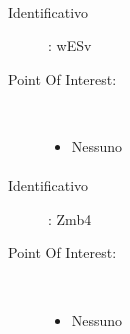 \documentclass[../SperimentazioniPratiche.tex]{subfiles}
\begin{document}
			\paragraph*{}
			\label{01005}
			\begin{tcolorbox}[fonttitle=\bfseries, 
								adjusted title={\Large Beacon 01005},
								sharp corners=south,
								colback=white, 
								colframe=white!50!blue!75!black]
								
				\begin{description}
					\item[Identificativo]: wESv

					\tcbline					
					
					\item[Point Of Interest:] \ \par
					\begin{itemize}
						\item Nessuno
					\end{itemize}					   				
				\end{description}  				
			\end{tcolorbox}
			
			\paragraph*{}
			\label{01006}
			\begin{tcolorbox}[fonttitle=\bfseries, 
								adjusted title={\Large Beacon 01006},
								sharp corners=south,
								colback=white, 
								colframe=white!50!blue!75!black]
								
				\begin{description}
					\item[Identificativo]: Zmb4

					\tcbline					
					
					\item[Point Of Interest:] \ \par
					\begin{itemize}
						\item Nessuno
					\end{itemize}					   				
				\end{description}  				
			\end{tcolorbox}
			
\end{document}
